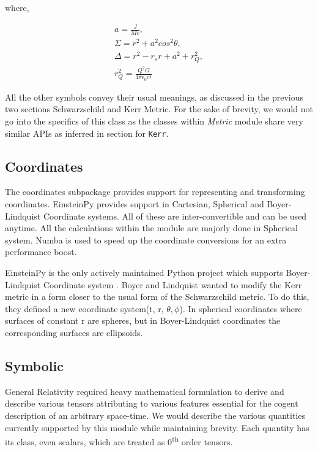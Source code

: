 \documentclass[refree]{aa}
\begin{document}
where,

\begin{gather}
a = \frac{J}{Mc}, \nonumber \\
\Sigma = r^2 + a^2 cos^2 \theta , \nonumber  \\
\Delta  = r^2 - r_s r + a^2 + r_Q ^ 2, \nonumber \\
r_Q ^ 2 = \frac{Q^2 G}{4\pi\epsilon_0 c^4} \nonumber
\end{gather}

All the other symbols convey their usual meanings, as discussed in the previous two sections Schwarzschild and Kerr Metric. For the sake of brevity, we would not go into the specifics of this class as the classes within \textit{Metric} module share very similar APIs as inferred in section for \texttt{Kerr}.

\subsection{Coordinates}
The coordinates subpackage provides support for representing and transforming coordinates. EinsteinPy provides support in Cartesian, Spherical and Boyer-Lindquist Coordinate systems. All of these are inter-convertible and can be used anytime. All the calculations within the module are majorly done in Spherical system. Numba \citep{Lam2015NumbaAL} is used to speed up the coordinate conversions for an extra performance boost.
 
EinsteinPy is the only actively maintained Python project which supports Boyer-Lindquist Coordinate system \citep{doi:10.1063/1.1705193}. Boyer and Lindquist wanted to modify the Kerr metric in a form closer to the usual form of the Schwarzschild metric. To do this, they defined a new coordinate system(t, r, $ \theta, \phi$).  In spherical coordinates where surfaces of constant r are spheres, but in  Boyer-Lindquist coordinates the corresponding surfaces are ellipsoids. 



\subsection{Symbolic}
General Relativity required heavy mathematical formulation to derive and describe various tensors attributing to various features essential for the cogent description of an arbitrary space-time. We would describe the various quantities currently supported by this module while maintaining brevity. Each quantity has its class, even scalars, which are treated as 0\textsuperscript{th} order tensors.
\end{document}
